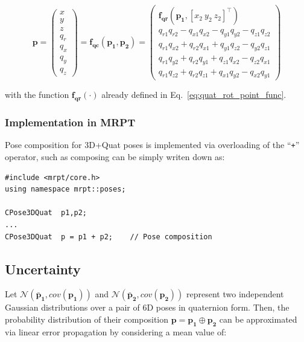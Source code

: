 \documentclass[a4paper,10pt]{report}
\begin{document}
\begin{equation}
\mathbf{p} = 
\left(\begin{array}{c}
 x \\ y \\ z \\ q_r \\ q_x \\ q_y \\ q_z      
\end{array}\right)
=\mathbf{f_{qc}}(\mathbf{p_1},\mathbf{p_2})
=
\left(\begin{array}{c}
  \mathbf{f_{qr}} (\mathbf{p_1}, [ x_2 ~ y_2 ~ z_2]^\top ) \\
q_{r1} q_{r2} - q_{x1} q_{x2} - q_{y1} q_{y2} - q_{z1} q_{z2} \\
q_{r1} q_{x2} + q_{r2} q_{x1} + q_{y1} q_{z2} - q_{y2} q_{z1} \\
q_{r1} q_{y2} + q_{r2} q_{y1} + q_{z1} q_{x2} - q_{z2} q_{x1} \\
q_{r1} q_{z2} + q_{r2} q_{z1} + q_{x1} q_{y2} - q_{x2} q_{y1}
\end{array}\right)
\end{equation}

\noindent with the function $\mathbf{f_{qr}}(\cdot)$ already defined in Eq.~\ref{eq:quat_rot_point_func}.


\subsubsection{Implementation in MRPT}

Pose composition for 3D+Quat poses is implemented via overloading 
of the ``\texttt{+}'' operator, such as composing can be simply 
writen down as:

\begin{lstlisting}
#include <mrpt/core.h> 
using namespace mrpt::poses; 

CPose3DQuat  p1,p2; 
...
CPose3DQuat  p = p1 + p2;    // Pose composition
\end{lstlisting}


\subsection{Uncertainty}

Let $\mathcal{N}(\mathbf{\bar{p}_1}, cov(\mathbf{p_1}))$ and 
$\mathcal{N}(\mathbf{\bar{p}_2}, cov(\mathbf{p_2}))$ represent
two independent Gaussian distributions over a pair of 6D 
poses in quaternion form.
Then, the probability distribution of their composition 
$\mathbf{p} = \mathbf{p_1} \oplus \mathbf{p_2}$
can be approximated via linear error propagation by considering 
a mean value of:
\end{document}

